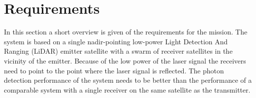 
\section{Requirements}
\label{dsePPRequirements}
In this section a short overview is given of the requirements for the mission. The system is based on a single nadir-pointing low-power Light Detection And Ranging (LiDAR) emitter satellite with a swarm of receiver satellites in the vicinity of the emitter. Because of the low power of the laser signal the receivers need to point to the point where the laser signal is reflected. The photon detection performance of the system needs to be better than the performance of a comparable system with a single receiver on the same satellite as the transmitter.
